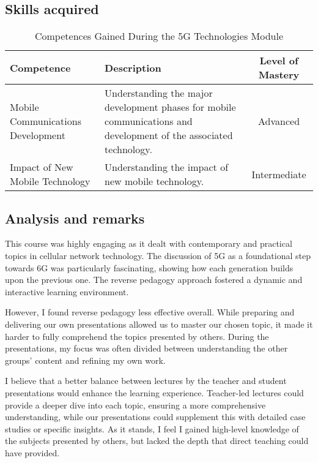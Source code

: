 \subsection{Skills acquired}
\begin{table}[h!]
    \centering
    \renewcommand{\arraystretch}{1.5} %
    \begin{tabular}{|p{3.5cm}|p{8cm}|c|}
    \hline
    \rowcolor[gray]{0.8}
    \textbf{Competence} & \textbf{Description} & \textbf{Level of Mastery} \\
    \hline
    Mobile Communications Development & Understanding the major development phases for mobile communications and development of the associated technology. & Advanced \\
    \hline
    Impact of New Mobile Technology & Understanding the impact of new mobile technology. & Intermediate \\
    \hline
    \end{tabular}
    \caption{Competences Gained During the 5G Technologies Module}
\end{table}

\subsection{Analysis and remarks}
\indent \indent This course was highly engaging as it dealt with contemporary and practical topics in cellular network technology. The discussion of 5G as a foundational step towards 6G was particularly fascinating, showing how each generation builds upon the previous one. The reverse pedagogy approach fostered a dynamic and interactive learning environment.
\vspace{0.25cm}

\noindent However, I found reverse pedagogy less effective overall. While preparing and delivering our own presentations allowed us to master our chosen topic, it made it harder to fully comprehend the topics presented by others. During the presentations, my focus was often divided between understanding the other groups' content and refining my own work.
\vspace{0.25cm}

\noindent I believe that a better balance between lectures by the teacher and student presentations would enhance the learning experience. Teacher-led lectures could provide a deeper dive into each topic, ensuring a more comprehensive understanding, while our presentations could supplement this with detailed case studies or specific insights. As it stands, I feel I gained high-level knowledge of the subjects presented by others, but lacked the depth that direct teaching could have provided.